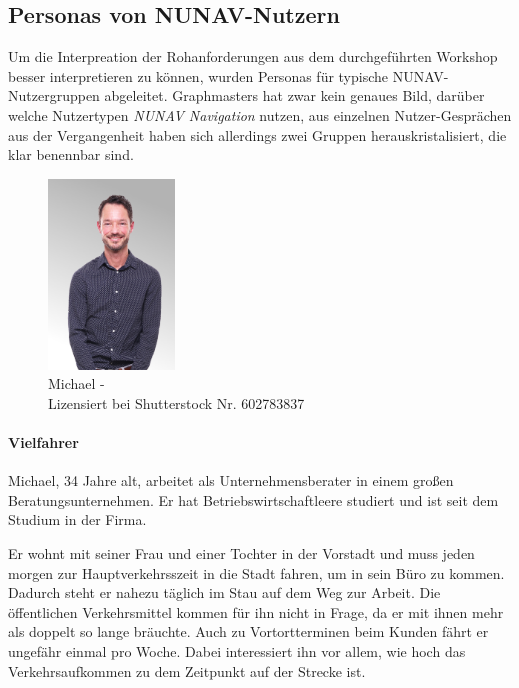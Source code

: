\subsection{Personas von NUNAV-Nutzern}
\label{sec:06_model_evaluation:personas}

Um die Interpreation der Rohanforderungen aus dem durchgeführten Workshop besser interpretieren zu können, wurden Personas für typische NUNAV-Nutzergruppen abgeleitet. Graphmasters hat zwar kein genaues Bild, darüber welche Nutzertypen \textit{NUNAV Navigation} nutzen, aus einzelnen Nutzer-Gesprächen aus der Vergangenheit haben sich allerdings zwei Gruppen herauskristalisiert, die klar benennbar sind.

\begin{figure}
    \vspace{-\intextsep}
    \centering
    \includegraphics[width=0.3\textwidth]{contents/06_model_evaluation/01_integration/res/persona_picture_michael.png}
    \caption{Michael -\\Lizensiert bei Shutterstock Nr. 602783837}
\end{figure}

\paragraph{Vielfahrer} Michael, 34 Jahre alt, arbeitet als Unternehmensberater in einem großen Beratungsunternehmen. Er hat Betriebswirtschaftleere studiert und ist seit dem Studium in der Firma.

Er wohnt mit seiner Frau und einer Tochter in der Vorstadt und muss jeden morgen zur Hauptverkehrsszeit in die Stadt fahren, um in sein Büro zu kommen. Dadurch steht er nahezu täglich im Stau auf dem Weg zur Arbeit. Die öffentlichen Verkehrsmittel kommen für ihn nicht in Frage, da er mit ihnen mehr als doppelt so lange bräuchte. Auch zu Vortortterminen beim Kunden fährt er ungefähr einmal pro Woche. Dabei interessiert ihn vor allem, wie hoch das Verkehrsaufkommen zu dem Zeitpunkt auf der Strecke ist.

